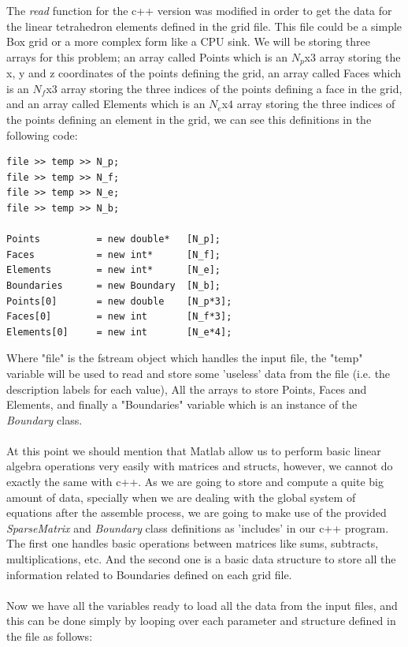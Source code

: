 \documentclass[12pt]{article}
\begin{document}
The \textit{read} function for the c++ version was modified in order to get the data for the linear tetrahedron elements defined in the grid file. This file could be a simple Box grid or a more complex form like a CPU sink. We will be storing three arrays for this problem; an array called Points which is an $N_p$x$3$ array storing the x, y and z coordinates of the points defining the grid, an array called Faces which is an $N_f$x$3$ array storing the three indices of the points defining a face in the grid, and an array called Elements which is an $N_e$x$4$ array storing the three indices of the points defining an element in the grid, we can see this definitions in the following code:

\begin{lstlisting}[style=MyC++Style]
file >> temp >> N_p;
file >> temp >> N_f;
file >> temp >> N_e;
file >> temp >> N_b;

Points			= new double*	[N_p];
Faces			= new int*		[N_f];
Elements		= new int*		[N_e];
Boundaries		= new Boundary  [N_b];
Points[0]       = new double    [N_p*3];
Faces[0]        = new int       [N_f*3];
Elements[0]     = new int       [N_e*4];
\end{lstlisting}

Where "file" is the fstream object which handles the input file, the "temp" variable will be used to read and store some 'useless' data from the file (i.e. the description labels for each value), All the arrays to store Points, Faces and Elements, and finally a "Boundaries" variable which is an instance of the \textit{Boundary} class. 
\\\\
At this point we should mention that Matlab allow us to perform basic linear algebra operations very easily with matrices and structs, however, we cannot do exactly the same with c++. As we are going to store and compute a quite big amount of data, specially when we are dealing with the global system of equations after the assemble process, we are going to make use of the provided \textit{SparseMatrix} and \textit{Boundary} class definitions as 'includes' in our c++ program. The first one handles basic operations between matrices like sums, subtracts, multiplications, etc. And the second one is a basic data structure to store all the information related to Boundaries defined on each grid file. 
\\\\
Now we have all the variables ready to load all the data from the input files, and this can be done simply by looping over each parameter and structure defined in the file as follows:
\end{document}
